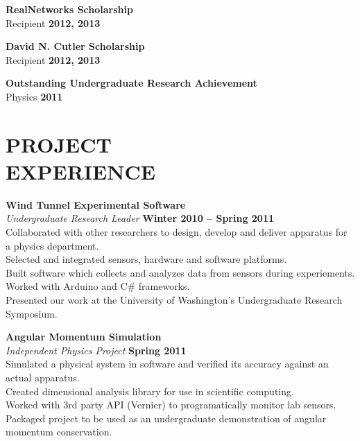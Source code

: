 \documentclass[margin,line]{resume}
\begin{document}
\begin{resume}
    \textbf{\listing RealNetworks Scholarship}\\
    Recipient \hfill \textbf{2012, 2013}

    \textbf{\listing David N. Cutler Scholarship}\\
    Recipient \hfill \textbf{2012, 2013}

    \textbf{\listing Outstanding Undergraduate Research Achievement}\\
    Physics \hfill \textbf{2011}

\sectionline

    \section{\mysidestyle \textbf{\large{P}\small{ROJECT\\EXPERIENCE}}}

    \textbf{\listing Wind Tunnel Experimental Software} \vspace{2mm}\\\vspace{1mm}%
    \textsl{Undergraduate Research Leader} \hfill \textbf{Winter 2010 -- Spring 2011}\\
    Collaborated with other researchers to design, develop and deliver apparatus for a physics department.\\
    Selected and integrated sensors, hardware and software platforms.\\
    Built software which collects and analyzes data from sensors during experiements.\\
    Worked with Arduino and C\# frameworks.\\
    Presented our work at the University of Washington's Undergraduate Research Symposium.

    \textbf{\listing Angular Momentum Simulation} \vspace{2mm}\\\vspace{1mm}%
    \textsl{Independent Physics Project} \hfill \textbf{Spring 2011}\\
    Simulated a physical system in software and verified its accuracy against an actual apparatus.\\
    Created dimensional analysis library for use in scientific computing.\\
    Worked with 3rd party API (Vernier) to programatically monitor lab sensors.\\
    Packaged project to be used as an undergraduate demonstration of angular momentum conservation.


\end{resume}
\end{document}

